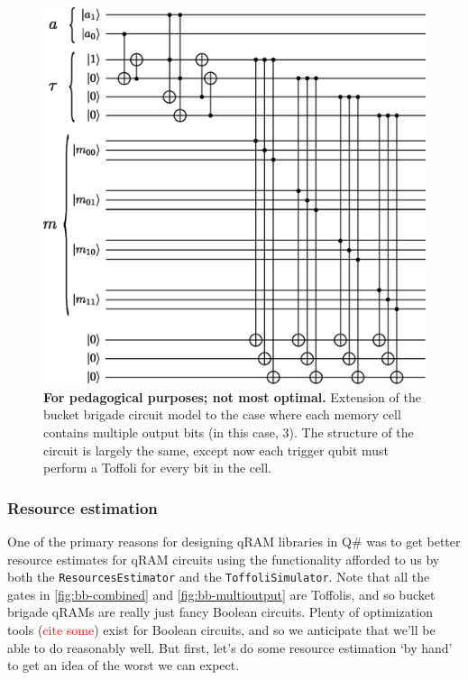 \documentclass[a4paper,12pt]{article}
\begin{document}
\begin{figure}
 \centering
 \captionsetup{width=.89\linewidth}
 \includegraphics[scale=0.7]{images/bb-2qubit-3bitout}
 \caption{\textbf{For pedagogical purposes; not most optimal.} 
 Extension of the bucket brigade circuit model to the case where each memory cell contains multiple output bits (in this case, 3). 
 The structure of the circuit is largely the same, except now each trigger qubit must perform a Toffoli for every bit in the cell.}
 \label{fig:bb-multioutput}
\end{figure}


\subsubsection{Resource estimation}

One of the primary reasons for designing qRAM libraries in Q\# was to get better resource estimates for qRAM circuits using the functionality afforded to us by both the \texttt{ResourcesEstimator} and the \texttt{ToffoliSimulator}.
Note that all the gates in \autoref{fig:bb-combined} and \autoref{fig:bb-multioutput} are Toffolis, and so bucket brigade qRAMs are really just fancy Boolean circuits. 
Plenty of optimization tools (\textcolor{red}{cite some}) exist for Boolean circuits, and so we anticipate that we'll be able to do reasonably well. 
But first, let's do some resource estimation `by hand' to get an idea of the worst we can expect.
\end{document}
